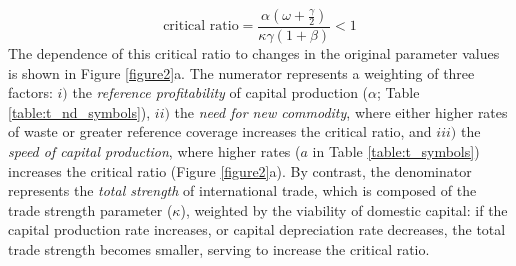 \documentclass[9pt,twocolumn,twoside,lineno]{pnas-new}
\begin{document}
\begin{equation}
  \text{critical ratio} = \frac{ \alpha (\omega + \frac{\gamma}{2})}{\kappa \gamma(1+\beta)} < 1
\end{equation}
%
The dependence of this critical ratio to changes in the original parameter values is shown in Figure \ref{figure2}a. The numerator represents a weighting of three factors: $i)$ the \textit{reference profitability} of capital production ($\alpha$; Table \ref{table:t_nd_symbols}), $ii)$ the \textit{need for new commodity}, where either higher rates of waste or greater reference coverage increases the critical ratio, and $iii)$ the \textit{speed of capital production}, where higher rates ($a$ in Table \ref{table:t_symbols}) increases the critical ratio (Figure \ref{figure2}a). By contrast, the denominator represents the \textit{total strength} of international trade, which is composed of the trade strength parameter ($\kappa$), weighted by the viability of domestic capital: if the capital production rate increases, or capital depreciation rate decreases, the total trade strength becomes smaller, serving to increase the critical ratio.
\end{document}
